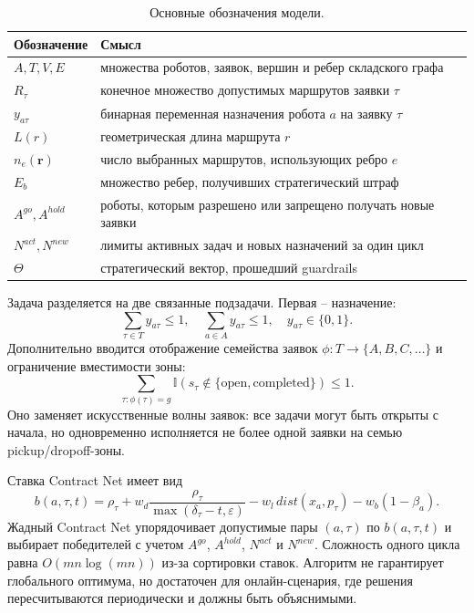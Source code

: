 \documentclass[runningheads]{llncs}
\begin{document}
\begin{table}[!htbp]
\centering
\caption{Основные обозначения модели.}
\label{tab:notation}
\scriptsize
\begin{tabular}{p{}p{}}
\toprule
Обозначение & Смысл \\
\midrule
$A,T,V,E$ & множества роботов, заявок, вершин и ребер складского графа \\
$R_\tau$ & конечное множество допустимых маршрутов заявки $\tau$ \\
$y_{a\tau}$ & бинарная переменная назначения робота $a$ на заявку $\tau$ \\
$L(r)$ & геометрическая длина маршрута $r$ \\
$n_e(\mathbf r)$ & число выбранных маршрутов, использующих ребро $e$ \\
$E_b$ & множество ребер, получивших стратегический штраф \\
$A^{go},A^{hold}$ & роботы, которым разрешено или запрещено получать новые заявки \\
$N^{act},N^{new}$ & лимиты активных задач и новых назначений за один цикл \\
$\Theta$ & стратегический вектор, прошедший guardrails \\
\bottomrule
\end{tabular}
\end{table}

Задача разделяется на две связанные подзадачи. Первая -- назначение:
\[
\sum_{\tau\in T}y_{a\tau}\le1,\quad
\sum_{a\in A}y_{a\tau}\le1,\quad
y_{a\tau}\in\{0,1\}.
\]
Дополнительно вводится отображение семейства заявок $\phi:T\rightarrow\{A,B,C,\ldots\}$ и ограничение вместимости зоны:
\[
\sum_{\tau:\phi(\tau)=g}\mathbb{I}(s_\tau\notin\{\text{open},\text{completed}\})\le1.
\]
Оно заменяет искусственные волны заявок: все задачи могут быть открыты с начала, но одновременно исполняется не более одной заявки на семью pickup/dropoff-зоны.

Ставка Contract Net имеет вид
\[
b(a,\tau,t)=
\rho_\tau+w_d\frac{\rho_\tau}{\max(\delta_\tau-t,\varepsilon)}
-w_l\,dist(x_a,p_\tau)-w_b(1-\beta_a).
\]
Жадный Contract Net упорядочивает допустимые пары $(a,\tau)$ по $b(a,\tau,t)$ и выбирает победителей с учетом $A^{go}$, $A^{hold}$, $N^{act}$ и $N^{new}$. Сложность одного цикла равна $O(mn\log(mn))$ из-за сортировки ставок. Алгоритм не гарантирует глобального оптимума, но достаточен для онлайн-сценария, где решения пересчитываются периодически и должны быть объяснимыми.
\end{document}
